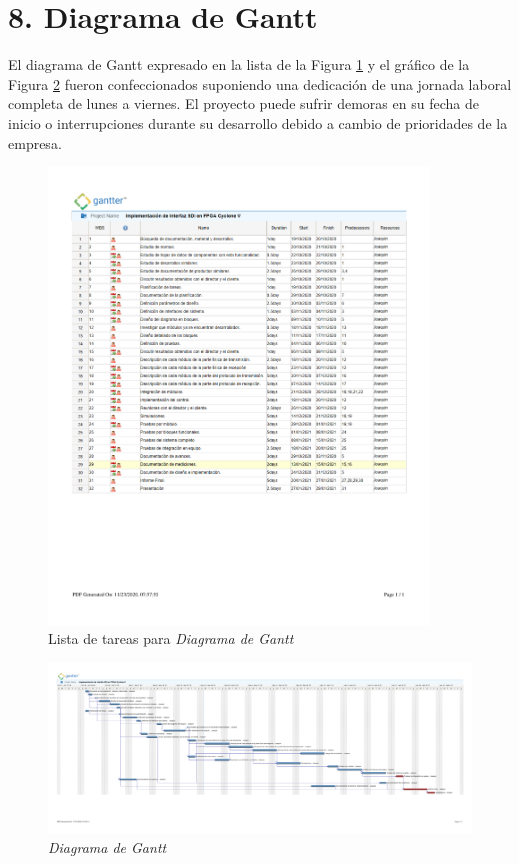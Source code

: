 \documentclass[11pt]{charter}
\begin{document}
\section{8. Diagrama de Gantt}
\label{sec:gantt}

El diagrama de Gantt expresado en la lista de la Figura \ref{fig:gantt1} y el gráfico de la Figura \ref{fig:gantt2} fueron confeccionados suponiendo una dedicación de una jornada laboral completa de lunes a viernes. El proyecto puede sufrir demoras en su fecha de inicio o interrupciones durante su desarrollo debido a cambio de prioridades de la empresa.

\begin{figure}[htpb]
\centering 
\includegraphics[width=0.9\textwidth]{./Figuras/gannt_list.pdf}
\caption{Lista de tareas para \textit{Diagrama de Gantt}}
\label{fig:gantt1}
\end{figure}

\begin{figure}[htpb]
\centering 
\includegraphics[width=1.5\textwidth, angle =270]{./Figuras/gantt_chart.pdf}
\caption{\textit{Diagrama de Gantt}}
\label{fig:gantt2}
\end{figure}
\end{document}
